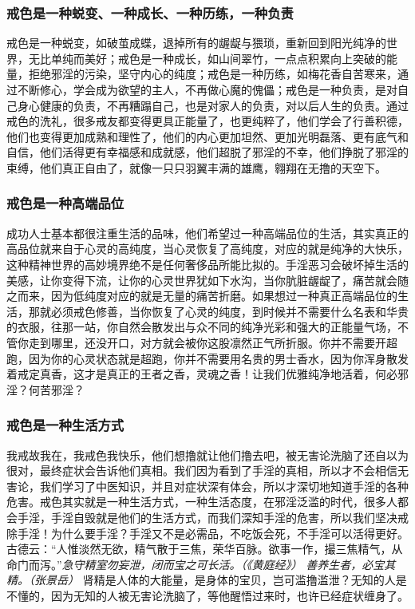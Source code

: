 \subsubsection{戒色是一种蜕变、一种成长、一种历练，一种负责}

戒色是一种蜕变，如破茧成蝶，退掉所有的龌龊与猥琐，重新回到阳光纯净的世界，无比单纯而美好；戒色是一种成长，如山间翠竹，一点点积累向上突破的能量，拒绝邪淫的污染，坚守内心的纯度；戒色是一种历练，如梅花香自苦寒来，通过不断修心，学会成为欲望的主人，不再做心魔的傀儡；戒色是一种负责，是对自己身心健康的负责，不再糟蹋自己，也是对家人的负责，对以后人生的负责。通过戒色的洗礼，很多戒友都变得更具正能量了，也更纯粹了，他们学会了行善积德，他们也变得更加成熟和理性了，他们的内心更加坦然、更加光明磊落、更有底气和自信，他们活得更有幸福感和成就感，他们超脱了邪淫的不幸，他们挣脱了邪淫的束缚，他们真正自由了，就像一只只羽翼丰满的雄鹰，翱翔在无撸的天空下。

\subsubsection{戒色是一种高端品位}

成功人士基本都很注重生活的品味，他们希望过一种高端品位的生活，其实真正的高品位就来自于心灵的高纯度，当心灵恢复了高纯度，对应的就是纯净的大快乐，这种精神世界的高妙境界绝不是任何奢侈品所能比拟的。手淫恶习会破坏掉生活的美感，让你变得下流，让你的心灵世界犹如下水沟，当你肮脏龌龊了，痛苦就会随之而来，因为低纯度对应的就是无量的痛苦折磨。如果想过一种真正高端品位的生活，那就必须戒色修善，当你恢复了心灵的纯度，到时候并不需要什么名表和华贵的衣服，往那一站，你自然会散发出与众不同的纯净光彩和强大的正能量气场，不管你走到哪里，还没开口，对方就会被你这股凛然正气所折服。你并不需要开超跑，因为你的心灵状态就是超跑，你并不需要用名贵的男士香水，因为你浑身散发着戒定真香，这才是真正的王者之香，灵魂之香！让我们优雅纯净地活着，何必邪淫？何苦邪淫？

\subsubsection{戒色是一种生活方式}

我戒故我在，我戒色我快乐，他们想撸就让他们撸去吧，被无害论洗脑了还自以为很对，最终症状会告诉他们真相。我们因为看到了手淫的真相，所以才不会相信无害论，我们学习了中医知识，并且对症状深有体会，所以才深切地知道手淫的各种危害。戒色其实就是一种生活方式，一种生活态度，在邪淫泛滥的时代，很多人都会手淫，手淫自毁就是他们的生活方式，而我们深知手淫的危害，所以我们坚决戒除手淫！为什么要手淫？手淫又不是必需品，不吃饭会死，不手淫可以活得更好。古德云：“人惟淡然无欲，精气散于三焦，荣华百脉。欲事一作，撮三焦精气，从命门而泻。”\textit{急守精室勿妄泄，闭而宝之可长活。（《黄庭经》）} \textit{善养生者，必宝其精。（张景岳）} 肾精是人体的大能量，是身体的宝贝，岂可滥撸滥泄？无知的人是不懂的，因为无知的人被无害论洗脑了，等他醒悟过来时，也许已经症状缠身了。

